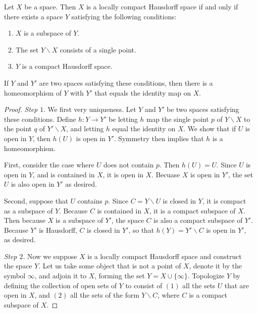\documentclass[12pt, a4paper, oneside, openright, titlepage]{book}
\begin{document}
\begin{thm}
    Let $X$ be a space. Then $X$ is a locally compact Hausdorff space if and only if there exists a space $Y$ satisfying the following conditions: \begin{enumerate}
        \item $X$ is a subspace of $Y$.
        \item The set $Y\backslash X$ consists of a single point.
        \item $Y$ is a compact Hausdorff space.
    \end{enumerate}
    If $Y$ and $Y'$ are two spaces satisfying these conditions, then there is a homeomorphism of $Y$ with $Y'$ that equals the identity map on $X$.
\end{thm}
\begin{proof}
    \emph{Step $1.$} We first very uniqueness. Let $Y$ and $Y'$ be two spaces satisfying these conditions. Define $h:Y\rightarrow Y'$ be letting $h$ map the single point $p$ of $Y\backslash X$ to the point $q$ of $Y'\backslash X$, and letting $h$ equal the identity on $X$. We show that if $U$ is open in $Y$, then $h(U)$ is open in $Y'$. Symmetry then implies that $h$ is a homeomorphism.

    First, consider the case where $U$ does not contain $p$. Then $h(U) = U$. Since $U$ is open in $Y$, and is contained in $X$, it is open in $X$. Becuase $X$ is open in $Y'$, the set $U$ is also open in $Y'$ as desired.

    Second, suppose that $U$ contains $p$. Since $C = Y\backslash U$ is closed in $Y$, it is compact as a subspace of $Y$. Because $C$ is contained in $X$, it is a compact subspace of $X$. Then because $X$ is a subspace of $Y'$, the space $C$ is also a compact subspace of $Y'$. Because $Y'$ is Hausdorff, $C$ is closed in $Y'$, so that $h(Y) = Y'\backslash C$ is open in $Y'$, as desired.

    \emph{Step $2$.} Now we suppose $X$ is a locally compact Hausdorff space and construct the space $Y$. Let us take some object that is not a point of $X$, denote it by the symbol $\infty$, and adjoin it to $X$, forming the set $Y = X \cup \{\infty\}$. Topologize $Y$ by defining the collection of open sets of $Y$ to consist of $(1)$ all the sets $U$ that are open in $X$, and $(2)$ all the sets of the form $Y \backslash C$, where $C$ is a compact subspace of $X$.


\end{proof}
\end{document}
